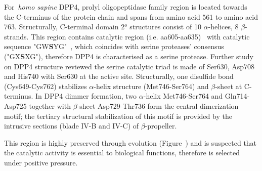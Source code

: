 For~\textit{homo sapine} DPP4, prolyl oligopeptidase family region is located towards the C-terminus of the protein chain and spans from amino acid 561 to amino acid 763. Structurally, C-terminal domain 2$^{o}$ structures consist of 10 $\alpha$-helices, 8 $\beta$-strands. This region contains catalytic region (i.e. aa605-aa635)~\cite{Rawlings1991,Barrett1992,Polgár1992,Rawlings1994} with catalytic sequence "GW\textbf{S}YG"~\cite{Ogata_1992}, which coincides with serine proteases' consensus ("GX\textbf{S}XG"), therefore DPP4 is characterised as a serine protease. Further study on DPP4 structure reviewed the serine catalytic triad is made of Ser630, Asp708 and His740 with Ser630 at the active site. Structurally, one disulfide bond (Cys649-Cys762) stabilizes $\alpha$-helix structure (Met746-Ser764) and $\beta$-sheet at C-terminus. In DPP4 dimmer formation, two $\alpha$-helix Met746-Ser764 and Gln714-Asp725 together with $\beta$-sheet Asp729-Thr736 form the central dimerization motif; the tertiary structural stabilization of this motif is provided by the intrusive sections (blade IV-B and IV-C) of $\beta$-propeller.~\cite{Engel_2003} 
\par
This region is highly preserved through evolution (Figure~) and is suspected that the catalytic activity is essential to biological functions, therefore is selected under positive pressure. 